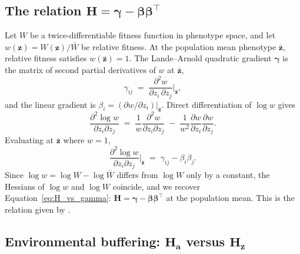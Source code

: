 \documentclass[9pt,twocolumn,twoside,lineno]{gsajnl}
\newcommand{\vect}[1]{\boldsymbol{#1}}
\newcommand{\mat}[1]{\mathbf{#1}}
\begin{document}
\subsection{The relation $\mat{H} = \bm{\gamma}-\bm{\beta}\bm{\beta}^{\top}$}

Let $W$ be a twice-differentiable fitness function in phenotype space, and let $w(\vect{z}) = W(\vect{z})/\bar{W}$ be relative fitness. At the population mean phenotype $\bar{\vect{z}}$, relative fitness satisfies $w(\bar{\vect{z}})=1$. The Lande--Arnold quadratic gradient $\bm{\gamma}$ is the matrix of second partial derivatives of $w$ at $\bar{\vect{z}}$,
\[
\gamma_{ij} \;=\; \frac{\partial^2 w}{\partial z_i\,\partial z_j}\bigg|_{\bar{\vect{z}}},
\]
and the linear gradient is $\beta_i = (\partial w/\partial z_i)|_{\bar{\vect{z}}}$. Direct differentiation of $\log w$ gives
\[
\frac{\partial^2 \log w}{\partial z_i \partial z_j}
\;=\;
\frac{1}{w}\frac{\partial^2 w}{\partial z_i \partial z_j}
\;-\;
\frac{1}{w^2}\frac{\partial w}{\partial z_i}\frac{\partial w}{\partial z_j}.
\]
Evaluating at $\bar{\vect{z}}$ where $w=1$,
\[
\frac{\partial^2 \log w}{\partial z_i \partial z_j}\bigg|_{\bar{\vect{z}}}
\;=\;
\gamma_{ij} - \beta_i\beta_j.
\]
Since $\log w = \log W - \log\bar{W}$ differs from $\log W$ only by a constant, the Hessians of $\log w$ and $\log W$ coincide, and we recover Equation~\eqref{eq:H_vs_gamma}: $\mat{H} = \bm{\gamma}-\bm{\beta}\bm{\beta}^{\top}$ at the population mean. This is the relation given by \citet{PhillipsArnold1989}.

\subsection{Environmental buffering: $\mat{H}_{\vect{a}}$ versus $\mat{H}_{\vect{z}}$}
\end{document}
